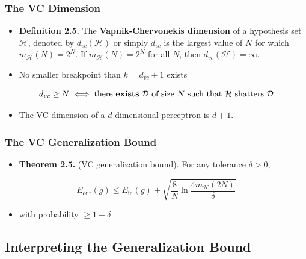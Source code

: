 \documentclass[11pt]{article}
\begin{document}
\subsubsection{The VC Dimension}
\label{sec:org4015901}
\begin{itemize}
\item \textbf{Definition 2.5.} The \textbf{Vapnik-Chervonekis dimension} of a hypothesis set \(\mathcal H\), denoted by \(d_{vc}(\mathcal H)\) or simply \(d_{vc}\) is the largest value of \(N\) for which \(m_\mathcal H (N) = 2^N\). If \(m_\mathcal H (N) = 2^N\) for all \(N\), then \(d_{vc}(\mathcal H) = \infty\).

\item No smaller breakpoint than \(k = d_{vc} +1\) exists
\end{itemize}

\begin{equation}
    d_{vc} \geq N \iff \text{there \textbf{exists} $\mathcal D$ of size $N$ such that $\mathcal H$ shatters $\mathcal D$}
\end{equation}

\begin{itemize}
\item The VC dimension of a \(d\) dimensional perceptron is \(d+1\).
\end{itemize}

\subsubsection{The VC Generalization Bound}
\label{sec:org4fa80d1}
\begin{itemize}
\item \textbf{Theorem 2.5.} (VC generalization bound). For any tolerance \(\delta > 0\),
\end{itemize}
\begin{equation}
  E_\text{out}(g) \leq E_\text{in}(g) + \sqrt{\frac8N\ln\frac{4m_\mathcal{H}(2N)}\delta}
\end{equation}
\begin{itemize}
\item with probability \(\geq 1-\delta\)
\end{itemize}

\subsection{Interpreting the Generalization Bound}
\label{sec:org4f0a117}
\end{document}
